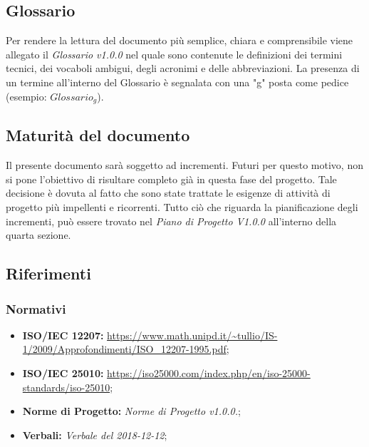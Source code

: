 \subsection{Glossario}
Per rendere la lettura del documento più semplice, chiara e comprensibile viene allegato il \emph{Glossario v1.0.0} nel quale sono contenute le definizioni dei termini tecnici, dei vocaboli ambigui, degli acronimi e delle abbreviazioni. La presenza di un termine all'interno del Glossario è segnalata con una "g" posta come pedice (esempio: $Glossario_{g}$).
\subsection{Maturità del documento}
Il presente documento sarà soggetto ad incrementi. Futuri per questo motivo, non si pone l'obiettivo di risultare completo già in questa fase del progetto.
Tale decisione è dovuta al fatto che sono state trattate le esigenze di attività di progetto più impellenti e ricorrenti.
Tutto ciò che riguarda la pianificazione degli incrementi, può essere trovato nel \emph{Piano di Progetto V1.0.0} all'interno della quarta sezione.  
\subsection{Riferimenti}

\subsubsection{Normativi}
\begin{itemize}
	\item \textbf{ISO/IEC 12207:} \url{https://www.math.unipd.it/~tullio/IS-1/2009/Approfondimenti/ISO_12207-1995.pdf};
	\item \textbf{ISO/IEC 25010:} \url{https://iso25000.com/index.php/en/iso-25000-standards/iso-25010};
	\item \textbf{Norme di Progetto:} \emph{Norme di Progetto v1.0.0.};
	\item \textbf{Verbali:} \emph{Verbale del 2018-12-12};
\end{itemize}
